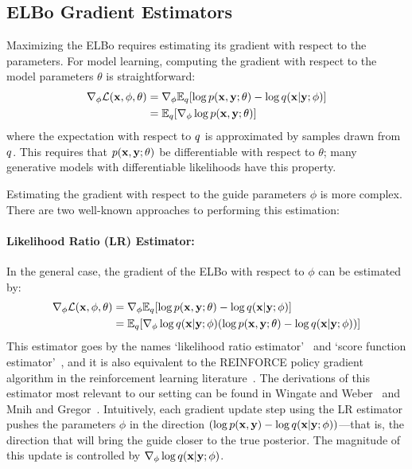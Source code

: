 \subsection{ELBo Gradient Estimators}

Maximizing the ELBo requires estimating its gradient with respect to the parameters. For model learning, computing the gradient with respect to the model parameters $\theta$ is straightforward:
\begin{align}
\begin{split}
\nabla_\phi \mathcal{L}(\mathbf{x}, \phi, \theta)
&= \nabla_\phi \mathbb{E}_{q}[ \log p(\mathbf{x}, \mathbf{y}; \theta) - \log q(\mathbf{x} | \mathbf{y} ; \phi) ]\\
&= \mathbb{E}_{q} [ \nabla_\phi \log p(\mathbf{x}, \mathbf{y}; \theta) ] 
\end{split}
\label{eq:modelParamGrad}
\end{align}
where the expectation with respect to $q$ is approximated by samples drawn from $q$. This requires that $p(\mathbf{x}, \mathbf{y}; \theta)$ be differentiable with respect to $\theta$; many generative models with differentiable likelihoods have this property.

Estimating the gradient with respect to the guide parameters $\phi$ is more complex.
There are two well-known approaches to performing this estimation:

\paragraph{Likelihood Ratio (LR) Estimator:}
In the general case, the gradient of the ELBo with respect to $\phi$ can be estimated by:
\begin{align}
\begin{split}
\nabla_\phi \mathcal{L}(\mathbf{x}, \phi, \theta)
&= \nabla_\phi \mathbb{E}_{q}[ \log p(\mathbf{x}, \mathbf{y}; \theta) - \log q(\mathbf{x} | \mathbf{y} ; \phi) ]\\
&= \mathbb{E}_{q}[ \nabla_\phi \log q(\mathbf{x} | \mathbf{y} ; \phi) ( \log p(\mathbf{x}, \mathbf{y}; \theta) - \log q(\mathbf{x} | \mathbf{y} ; \phi) ) ]
\end{split}
\label{eq:lr}
\end{align}
This estimator goes by the names `likelihood ratio estimator'~\cite{LikelihoodRatioEstimator} and `score function estimator'~\cite{ScoreFunctionEstimator}, and it is also equivalent to the REINFORCE policy gradient algorithm in the reinforcement learning literature~\cite{REINFORCE}. The derivations of this estimator most relevant to our setting can be found in Wingate and Weber~\cite{AVIPP} and Mnih and Gregor~\cite{NVIL}.
Intuitively, each gradient update step using the LR estimator pushes the parameters $\phi$ in the direction $( \log p(\mathbf{x}, \mathbf{y}) - \log q(\mathbf{x} | \mathbf{y} ; \phi) )$---that is, the direction that will bring the guide closer to the true posterior. The magnitude of this update is controlled by $\nabla_\phi \log q(\mathbf{x} | \mathbf{y} ; \phi)$.

